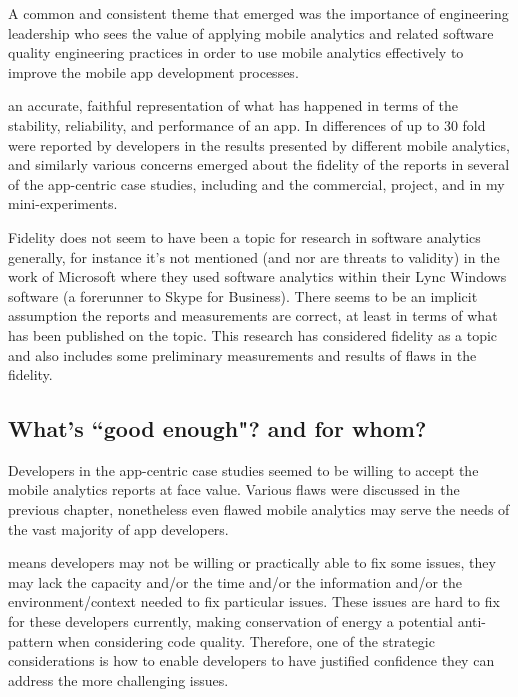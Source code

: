 A common and consistent theme that emerged was the importance of engineering leadership who sees the value of applying mobile analytics and related software quality engineering practices in order to use mobile analytics effectively to improve the mobile app development processes. 

    
an accurate, faithful representation of what has happened in terms of the stability, reliability, and performance of an app. In  differences of up to 30 fold were reported by developers in the results presented by different mobile analytics, and similarly various concerns emerged about the fidelity of the reports in several of the app-centric case studies, including  and the commercial,  project, and in my mini-experiments.

Fidelity does not seem to have been a topic for research in software analytics generally, for instance it's not mentioned (and nor are threats to validity) in the work of Microsoft where they used software analytics within their Lync Windows software (a forerunner to Skype for Business). There seems to be an implicit assumption the reports and measurements are correct, at least in terms of what has been published on the topic. This research has considered fidelity as a topic and also includes some preliminary measurements and results of flaws in the fidelity.

\subsection{What's ``good enough"? and for whom?}
Developers in the app-centric case studies seemed to be willing to accept the mobile analytics reports at face value. Various flaws were discussed in the previous chapter, nonetheless even flawed mobile analytics may serve the needs of the vast majority of app developers. 

 means developers may not be willing or practically able to fix some issues, they may lack the capacity and/or the time and/or the information and/or the environment/context needed to fix particular issues. These issues are hard to fix for these developers currently, making conservation of energy a potential anti-pattern when considering code quality.
Therefore, one of the strategic considerations is how to enable developers to have justified confidence they can address the more challenging issues.

